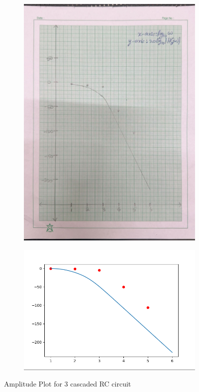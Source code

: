 \documentclass{article}
\begin{document}
\begin{figure}[H]
    \centering
    \begin{subfigure}[b]{0.45\textwidth}
        \centering
        \includegraphics[width=\textwidth]{figs/ampl3.png}

    \end{subfigure}
    \hfill
    \begin{subfigure}[b]{0.45\textwidth}
        \centering
        \includegraphics[width=1.7\textwidth]{figs/ampl_3cas.png}
    \end{subfigure}
    
    \caption{Amplitude Plot for 3 cascaded RC circuit}
\end{figure}
\end{document}
